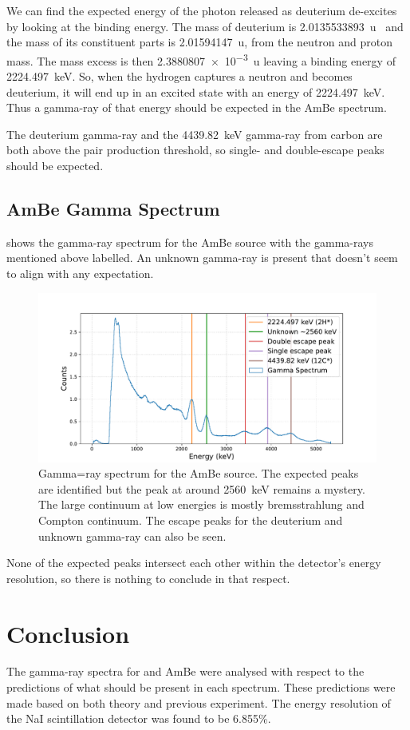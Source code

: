 \documentclass[11pt]{article}
\numberwithin{equation}{section}
\numberwithin{figure}{section}
\numberwithin{table}{section}
\begin{document}
We can find the expected energy of the photon released as deuterium de-excites by looking at the binding energy. The mass of deuterium is \SI{2.0135533893}{u}~\cite{deuterium} and the mass of its constituent parts is \SI{2.01594147}{u}, from the neutron and proton mass. The mass excess is then \SI{2.3880807e-3}{u} leaving a binding energy of \SI{2224.497}{\kilo\electronvolt}. So, when the hydrogen captures a neutron and becomes deuterium, it will end up in an excited state with an energy of \SI{2224.497}{\kilo\electronvolt}. Thus a gamma-ray of that energy should be expected in the AmBe spectrum. 

The deuterium gamma-ray and the \SI{4439.82}{\kilo\electronvolt} gamma-ray from carbon are both above the pair production threshold, so single- and double-escape peaks should be expected. 

\subsection{AmBe Gamma Spectrum}
 shows the gamma-ray spectrum for the AmBe source with the gamma-rays mentioned above labelled. An unknown gamma-ray is present that doesn't seem to align with any expectation. 

\begin{figure}[h]
    \begin{center}
        \includegraphics[width=.8\textwidth]{Plots/ambe.pdf}
        \caption{Gamma=ray spectrum for the AmBe source. The expected peaks are identified but the peak at around \SI{2560}{\kilo\electronvolt} remains a mystery. The large continuum at low energies is mostly bremsstrahlung and Compton continuum. The escape peaks for the deuterium and unknown gamma-ray can also be seen. }
        \label{fig:AmBe_Spectrum}
    \end{center}
\end{figure}

None of the expected peaks intersect each other within the detector's energy resolution, so there is nothing to conclude in that respect. 

\section{Conclusion}\label{sec:Conclusion}
The gamma-ray spectra for  and AmBe were analysed with respect to the predictions of what should be present in each spectrum. These predictions were made based on both theory and previous experiment. The energy resolution of the NaI scintillation detector was found to be 6.855\%.

\newpage
\printbibliography
\end{document}
